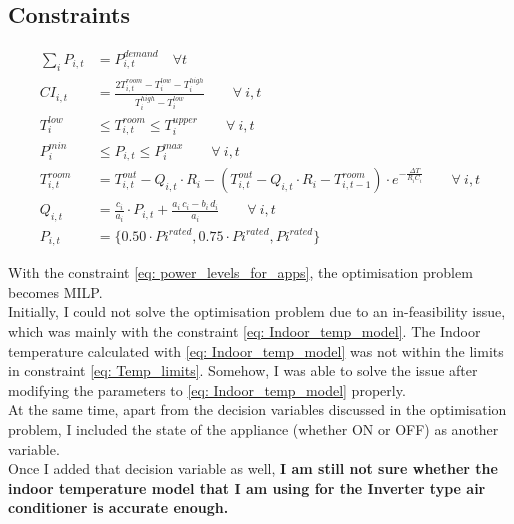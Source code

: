 \documentclass[12pt,a4paper]{article}
\begin{document}
\subsection*{\small Constraints}
\begin{align}
    \label{eq: power_balance}
    \sum\limits_{i} P_{i,t} &= P_{i,t}^{demand} \quad \forall t \\
     \label{eq: CI_intro}
    CI_{i,t} &= \frac{2T_{i,t}^{room}- T_{i}^{low}-T_{i}^{high}}{T_{i}^{high}-T_{i}^{low}} \quad \quad \forall \: i,t\\
     \label{eq: Temp_limits}
    T_{i}^{low} &\leq T_{i,t}^{room} \leq  T_{i}^{upper}\quad \quad \forall \: i,t \\
    \label{eq: Power_limits}
    P_{i}^{min} &\leq P_{i,t} \leq  P_{i}^{max}  \quad \quad \forall \: i,t \\
     \label{eq: Indoor_temp_model}
    T_{i,t}^{room} &= T_{i,t}^{out} - Q_{i,t}\cdot R_{i} - (T_{i,t}^{out} - Q_{i,t}\cdot R_{i}
    - T_{i,t-1}^{room})\cdot e^{-\frac{\Delta T}{R_{i}C_{i}}}  \quad \quad \forall \: i,t\\
    \label{eq: Inverter_AC_model}
    Q_{i,t} &= \frac{c_{i}}{a_{i}}\cdot P_{i,t} + \frac{a_{i}\, c_{i}- b_{i}\, d_{i}}{a_{i}} \quad \quad \forall \: i,t \\
    \label{eq: power_levels_for_apps}
    P_{i,t} &= \{0.50\cdot P{i}^{rated}, 0.75\cdot P{i}^{rated}, P{i}^{rated} \}
  \end{align}
    
With the constraint \eqref{eq: power_levels_for_apps}, the optimisation problem becomes MILP.\\

Initially, I could not solve the optimisation problem due to an in-feasibility issue, which was mainly with the constraint \eqref{eq: Indoor_temp_model}. The Indoor temperature calculated with \eqref{eq: Indoor_temp_model} was not within the limits in constraint \eqref{eq: Temp_limits}. Somehow, I was able to solve the issue after modifying the parameters to \eqref{eq: Indoor_temp_model} properly. \\

At the same time, apart from the decision variables discussed in the optimisation problem, I included the state of the appliance (whether ON or OFF) as another variable. \\

Once I added that decision variable as well, \textbf{I am still not sure whether the indoor temperature model that I am using for the Inverter type air conditioner \cite{7890446}  %
is accurate enough.}\\
\end{document}
